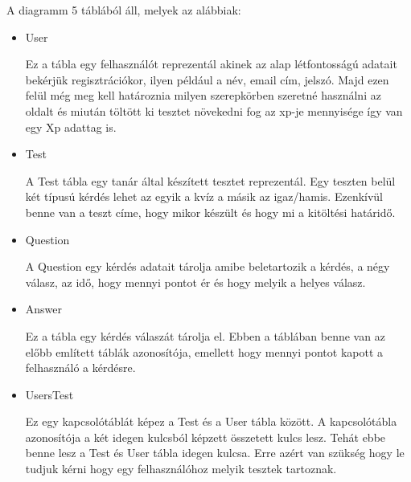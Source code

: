 A diagramm 5 táblából áll, melyek az alábbiak:
\begin{itemize}
    \item {User}
          \begin{addmargin}[\parindent]{0pt}
              Ez a tábla egy felhasználót reprezentál akinek az alap létfontosságú adatait bekérjük regisztrációkor, ilyen például a név, email cím, jelszó. Majd ezen felül még meg kell határoznia milyen szerepkörben szeretné használni az oldalt és miután töltött ki tesztet növekedni fog az xp-je mennyisége így van egy Xp adattag is.
          \end{addmargin}

    \item {Test}
          \begin{addmargin}[\parindent]{0pt}
              A Test tábla egy tanár által készített tesztet reprezentál. Egy teszten belül két típusú kérdés lehet az egyik a kvíz a másik az igaz/hamis. Ezenkívül benne van a teszt címe, hogy mikor készült és hogy mi a kitöltési határidő.
          \end{addmargin}

    \item {Question}
          \begin{addmargin}[\parindent]{0pt}
              A Question egy kérdés adatait tárolja amibe beletartozik a kérdés, a négy válasz, az idő, hogy mennyi pontot ér és hogy melyik a helyes válasz.
          \end{addmargin}

    \item {Answer}
          \begin{addmargin}[\parindent]{0pt}
              Ez a tábla egy kérdés válaszát tárolja el. Ebben a táblában benne van az előbb említett táblák azonosítója, emellett hogy mennyi pontot kapott a felhasználó a kérdésre.
          \end{addmargin}

    \item {UsersTest}
          \begin{addmargin}[\parindent]{0pt}
              Ez egy kapcsolótáblát képez a Test és a User tábla között. A kapcsolótábla azonosítója a két idegen kulcsból képzett összetett kulcs lesz. Tehát ebbe benne lesz a Test és User tábla idegen kulcsa. Erre azért van szükség hogy le tudjuk kérni hogy egy felhasználóhoz melyik tesztek tartoznak.
          \end{addmargin}

\end{itemize}

